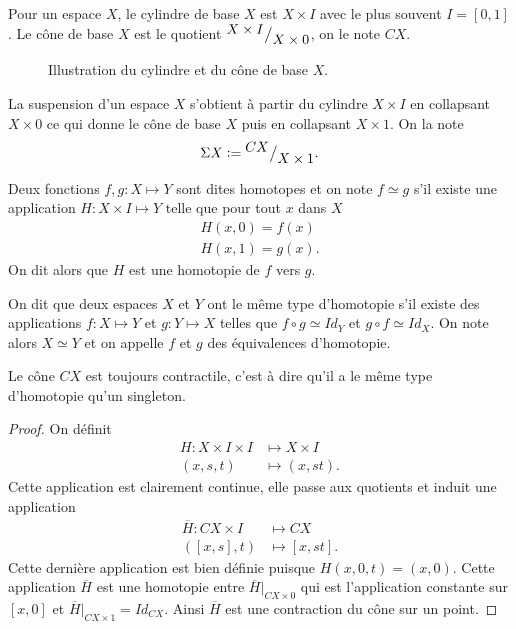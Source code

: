 \documentclass[main.tex]{subfiles}
\begin{document}
	\begin{definition}
		Pour un espace $X$, le cylindre de base $X$ est $X \times I$ avec le plus souvent $I = [0,1]$.
		Le cône de base $X$ est le quotient ${^{\textstyle X\times I}\big/_{\textstyle X \times 0}}$, on le note $CX$.
	\end{definition}

	\begin{figure}[!ht]
	    \centering
	    \caption{Illustration du cylindre et du cône de base $X$.}
	\end{figure}

	\begin{definition}[Suspension]
		La suspension d'un espace $X$ s'obtient à partir du cylindre $X \times I$ en collapsant $X \times 0$ ce qui donne le cône de base $X$ puis en collapsant $X \times 1$. On la note \[
			\Sigma X \vcentcolon= {^{\textstyle CX}\big/_{\textstyle X \times 1}}
		.\] 	
	\end{definition}

	\begin{definition}[Homotopie]
		Deux fonctions $f,g : X \longmapsto Y$ sont dites homotopes et on note $f \simeq g$ s'il existe une application $H : X \times I \longmapsto Y$ telle que pour tout $x$ dans $X$ 
		\begin{align*}
			H(x,0) = f(x) \\
			H(x,1) = g(x)
		.\end{align*} On dit alors que $H$ est une homotopie de $f$ vers $g$.
	\end{definition}

	\begin{definition}
		On dit que deux espaces $X$ et $Y$ ont le même type d'homotopie s'il existe des applications $f : X \longmapsto Y$ et $g : Y \longmapsto X$ telles que $f \circ g \simeq Id_Y$ et $g \circ f \simeq Id_X$. On note alors $X \simeq Y$ et on appelle $f$ et $g$ des équivalences d'homotopie.	
	\end{definition}

	\begin{prop}
		Le cône $CX$ est toujours contractile, c'est à dire qu'il a le même type d'homotopie qu'un singleton.	
	\end{prop}
	\begin{proof}
		On définit 
		\begin{align*}
			H : X \times I \times I &\longmapsto X \times I \\
			(x,s,t) &\longmapsto (x,st)
		.\end{align*}
		Cette application est clairement continue, elle passe aux quotients et induit une application
		\begin{align*}
			\overline{H} : CX \times I &\longmapsto CX \\
			([x,s],t) &\longmapsto [x,st]
		.\end{align*}
		Cette dernière application est bien définie puisque $H(x,0,t) = (x,0)$. Cette application  $\overline{H}$ est une homotopie entre $\overline{H} \vert_{CX \times 0}$
		qui est l'application constante sur $[x,0]$ et $\overline{H} \vert _{CX \times 1} = Id_{CX}$.
		Ainsi $\overline{H}$ est une contraction du cône sur un point.
	\end{proof}
\end{document}
